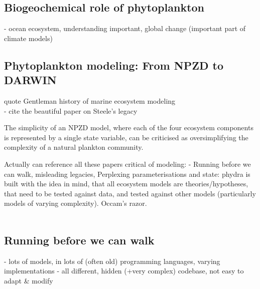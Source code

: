 \documentclass[template.tex]{subfiles}
\begin{document}
\introduction  %



\subsection{Biogeochemical role of phytoplankton}
- ocean ecosystem, understanding important, global change (important part of climate models)

\subsection{Phytoplankton modeling: From NPZD to DARWIN}
quote Gentleman history of marine ecosystem modeling
\\
- cite the beautiful paper on Steele's legacy
\citep{Anderson2019RememberingEcosystems}

The simplicity of an NPZD model, where each of the four ecosystem components is represented by a single state variable, can be criticised as oversimplifying the complexity of a natural plankton community.

Actually can reference all these papers critical of modeling:
- Running before we can walk, misleading legacies, Perplexing parameterisations
and state: phydra is built with the idea in mind, that all ecosystem models are theories/hypotheses, that need to be tested against data, and tested against other models (particularly models of varying complexity). Occam's razor. \\
\\


\subsection{Running before we can walk}

- lots of models, in lots of (often old) programming languages, varying implementations
- all different, hidden (+very complex) codebase, not easy to adapt \& modify
\end{document}
